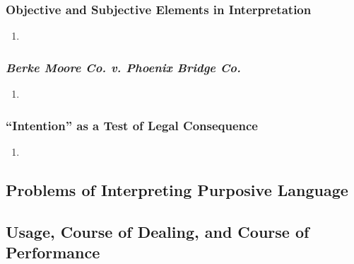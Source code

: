 \subsubsection{Objective and Subjective Elements in Interpretation}

\begin{enumerate}
    \item %
\end{enumerate}

\subsubsection{\emph{Berke Moore Co. v. Phoenix Bridge Co.}}

\begin{enumerate}
    \item %
\end{enumerate}

\subsubsection{``Intention'' as a Test of Legal Consequence}

\begin{enumerate}
    \item %
\end{enumerate}

\subsection{Problems of Interpreting Purposive Language}


\subsection{Usage, Course of Dealing, and Course of Performance}


